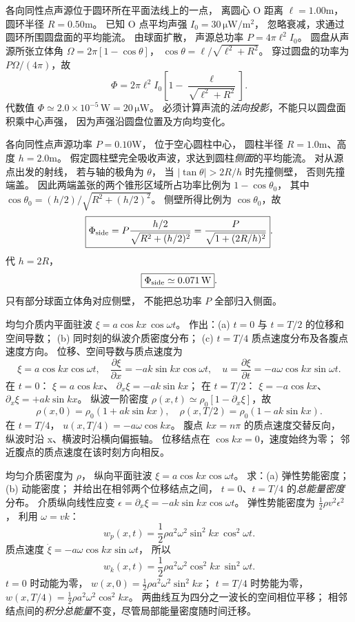 各向同性点声源位于圆环所在平面法线上的一点，
离圆心 O 距离 $\ell=1.00$m，
圆环半径 $R=0.50$m。
已知 O 点平均声强
$I_0=30\,\mathrm{\mu W/m^2}$，
忽略衰减，求通过圆环所围圆盘面的平均能流。
\exsolution
由球面扩散，
声源总功率
$P=4\pi\ell^2I_0$。
圆盘从声源所张立体角
$\Omega=2\pi[1-\cos\theta]$，
$\cos\theta=\ell/\sqrt{\ell^2+R^2}$。
穿过圆盘的功率为
$P\Omega/(4\pi)$，故
\[
\boxed{\Phi=
2\pi\ell^2I_0
\left[1-\frac{\ell}{\sqrt{\ell^2+R^2}}\right]}.
\]
代数值
$\boxed{\Phi\simeq2.0\times10^{-5}\,\mathrm W
=20\,\mathrm{\mu W}}$。
\excheck 必须计算声流的\emph{法向投影}，不能只以圆盘面积乘中心声强，
因为声强沿圆盘位置及方向均变化。

各向同性点声源功率 $P=0.10$W，
位于空心圆柱中心，
圆柱半径 $R=1.0$m、高度 $h=2.0$m。
假定圆柱壁完全吸收声波，求达到圆柱\emph{侧面}的平均能流。
\exsolution
对从源点出发的射线，
若与轴的极角为 $\theta$，
当 $|\tan\theta|>2R/h$ 时先撞侧壁，
否则先撞端盖。
因此两端盖张的两个锥形区域所占功率比例为
$1-\cos\theta_0$，
其中
$\cos\theta_0=(h/2)/\sqrt{R^2+(h/2)^2}$。
侧壁所得比例为 $\cos\theta_0$，故
\[
\boxed{\Phi_{\rm side}
=P\frac{h/2}{\sqrt{R^2+(h/2)^2}}
=\frac P{\sqrt{1+(2R/h)^2}}}.
\]
代 $h=2R$，
\[
\boxed{\Phi_{\rm side}\simeq0.071\,\mathrm W}.
\]
\excheck 只有部分球面立体角对应侧壁，
不能把总功率 $P$ 全部归入侧面。

均匀介质内平面驻波
$\xi=a\cos kx\,\cos\omega t$。
作出：(a) $t=0$ 与 $t=T/2$ 的位移和空间导数；
(b) 同时刻的纵波介质密度分布；
(c) $t=T/4$ 质点速度分布及各腹点速度方向。
\exsolution
位移、空间导数与质点速度为
\[
\xi=a\cos kx\cos\omega t,\quad
\frac{\partial\xi}{\partial x}
=-ak\sin kx\cos\omega t,\quad
u=\frac{\partial\xi}{\partial t}
=-a\omega\cos kx\sin\omega t.
\]
在 $t=0$：
$\xi=a\cos kx$、
$\partial_x\xi=-ak\sin kx$；
在 $t=T/2$：
$\xi=-a\cos kx$、
$\partial_x\xi=+ak\sin kx$。
纵波一阶密度
$\rho(x,t)\simeq\rho_0[1-\partial_x\xi]$，故
\[
\boxed{\rho(x,0)=\rho_0(1+ak\sin kx)},\quad
\boxed{\rho(x,T/2)=\rho_0(1-ak\sin kx)}.
\]
在 $t=T/4$，
$\boxed{u(x,T/4)=-a\omega\cos kx}$。
腹点 $kx=n\pi$ 的质点速度交替反向，
纵波时沿 x、横波时沿横向偏振轴。
\excheck 位移结点在 $\cos kx=0$，速度始终为零；
邻近腹点的质点速度在该时刻方向相反。

均匀介质密度为 $\rho$，
纵向平面驻波
$\xi=a\cos kx\cos\omega t$。
求：(a) 弹性势能密度；
(b) 动能密度；
并给出在相邻两个位移结点之间，
$t=0$、$t=T/4$ 的\emph{总能量密度}分布。
\exsolution
介质纵向线性应变
$\epsilon=\partial_x\xi=-ak\sin kx\cos\omega t$。
弹性势能密度为
$\tfrac12\rho v^2\epsilon^2$，
利用 $\omega=vk$：
\[
\boxed{w_p(x,t)=\frac12\rho a^2\omega^2
\sin^2kx\,\cos^2\omega t}.
\]
质点速度
$\dot\xi=-a\omega\cos kx\sin\omega t$，
所以
\[
\boxed{w_k(x,t)=\frac12\rho a^2\omega^2
\cos^2kx\,\sin^2\omega t}.
\]
$t=0$ 时动能为零，
$\boxed{w(x,0)=\tfrac12\rho a^2\omega^2\sin^2kx}$；
$t=T/4$ 时势能为零，
$\boxed{w(x,T/4)=\tfrac12\rho a^2\omega^2\cos^2kx}$。
\excheck 两曲线互为四分之一波长的空间相位平移；
相邻结点间的\emph{积分总能量}不变，尽管局部能量密度随时间迁移。

